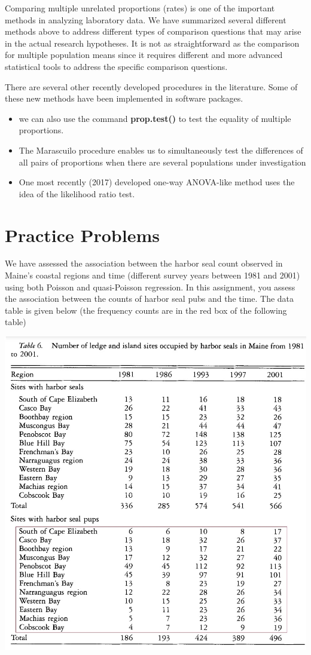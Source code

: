 \documentclass[
]{book}
\begin{document}
Comparing multiple unrelated proportions (rates) is one of the important methods in analyzing laboratory data. We have summarized several different methods above to address different types of comparison questions that may arise in the actual research hypotheses. It is not as straightforward as the comparison for multiple population means since it requires different and more advanced statistical tools to address the specific comparison questions.

There are several other recently developed procedures in the literature. Some of these new methods have been implemented in software packages.

\begin{itemize}
\item
  we can also use the command \textbf{prop.test()} to test the equality of multiple proportions.
\item
  The Marascuilo procedure enables us to simultaneously test the differences of all pairs of proportions when there are several populations under investigation
\item
  One most recently (2017) developed one-way ANOVA-like method uses the idea of the likelihood ratio test.
\end{itemize}

\hypertarget{practice-problems-5}{%
\section{Practice Problems}\label{practice-problems-5}}

We have assessed the association between the harbor seal count observed in Maine's coastal regions and time (different survey years between 1981 and 2001) using both Poisson and quasi-Poisson regression. In this assignment, you assess the association between the counts of harbor seal pubs and the time. The data table is given below (the frequency counts are in the red box of the following table)

\begin{center}\includegraphics[width=0.8\linewidth]{img13/w13-Assigment-HarborSeal} \end{center}
\end{document}
